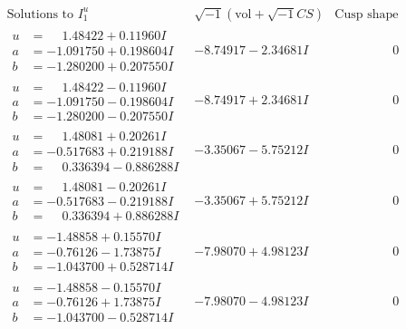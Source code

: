\documentclass[1p]{elsarticle_modified}
\theoremstyle{definition}
\newcommand{\I}{\sqrt{-1}}
\begin{document}
$$\begin{array}{c|c|c}
 \end{array}$$\newpage$$\begin{array}{c|c|c}  
\text{Solutions to }I^u_{1}& \I (\text{vol} + \sqrt{-1}CS) & \text{Cusp shape}\\
 \hline 
\begin{aligned}
u &= \phantom{-}1.48422 + 0.11960 I \\
a &= -1.091750 + 0.198604 I \\
b &= -1.280200 + 0.207550 I\end{aligned}
 & -8.74917 - 2.34681 I & \phantom{-0.000000 } 0 \\ \hline\begin{aligned}
u &= \phantom{-}1.48422 - 0.11960 I \\
a &= -1.091750 - 0.198604 I \\
b &= -1.280200 - 0.207550 I\end{aligned}
 & -8.74917 + 2.34681 I & \phantom{-0.000000 } 0 \\ \hline\begin{aligned}
u &= \phantom{-}1.48081 + 0.20261 I \\
a &= -0.517683 + 0.219188 I \\
b &= \phantom{-}0.336394 - 0.886288 I\end{aligned}
 & -3.35067 - 5.75212 I & \phantom{-0.000000 } 0 \\ \hline\begin{aligned}
u &= \phantom{-}1.48081 - 0.20261 I \\
a &= -0.517683 - 0.219188 I \\
b &= \phantom{-}0.336394 + 0.886288 I\end{aligned}
 & -3.35067 + 5.75212 I & \phantom{-0.000000 } 0 \\ \hline\begin{aligned}
u &= -1.48858 + 0.15570 I \\
a &= -0.76126 - 1.73875 I \\
b &= -1.043700 + 0.528714 I\end{aligned}
 & -7.98070 + 4.98123 I & \phantom{-0.000000 } 0 \\ \hline\begin{aligned}
u &= -1.48858 - 0.15570 I \\
a &= -0.76126 + 1.73875 I \\
b &= -1.043700 - 0.528714 I\end{aligned}
 & -7.98070 - 4.98123 I & \phantom{-0.000000 } 0 \\ \hline\begin{aligned}

\end{aligned}
\end{array}$$
\end{document}
